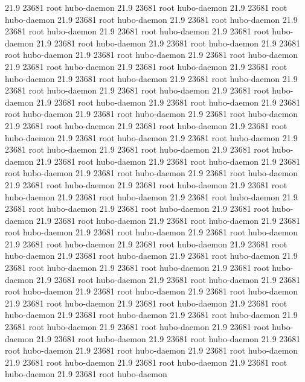 21.9 23681 root     hubo-daemon
21.9 23681 root     hubo-daemon
21.9 23681 root     hubo-daemon
21.9 23681 root     hubo-daemon
21.9 23681 root     hubo-daemon
21.9 23681 root     hubo-daemon
21.9 23681 root     hubo-daemon
21.9 23681 root     hubo-daemon
21.9 23681 root     hubo-daemon
21.9 23681 root     hubo-daemon
21.9 23681 root     hubo-daemon
21.9 23681 root     hubo-daemon
21.9 23681 root     hubo-daemon
21.9 23681 root     hubo-daemon
21.9 23681 root     hubo-daemon
21.9 23681 root     hubo-daemon
21.9 23681 root     hubo-daemon
21.9 23681 root     hubo-daemon
21.9 23681 root     hubo-daemon
21.9 23681 root     hubo-daemon
21.9 23681 root     hubo-daemon
21.9 23681 root     hubo-daemon
21.9 23681 root     hubo-daemon
21.9 23681 root     hubo-daemon
21.9 23681 root     hubo-daemon
21.9 23681 root     hubo-daemon
21.9 23681 root     hubo-daemon
21.9 23681 root     hubo-daemon
21.9 23681 root     hubo-daemon
21.9 23681 root     hubo-daemon
21.9 23681 root     hubo-daemon
21.9 23681 root     hubo-daemon
21.9 23681 root     hubo-daemon
21.9 23681 root     hubo-daemon
21.9 23681 root     hubo-daemon
21.9 23681 root     hubo-daemon
21.9 23681 root     hubo-daemon
21.9 23681 root     hubo-daemon
21.9 23681 root     hubo-daemon
21.9 23681 root     hubo-daemon
21.9 23681 root     hubo-daemon
21.9 23681 root     hubo-daemon
21.9 23681 root     hubo-daemon
21.9 23681 root     hubo-daemon
21.9 23681 root     hubo-daemon
21.9 23681 root     hubo-daemon
21.9 23681 root     hubo-daemon
21.9 23681 root     hubo-daemon
21.9 23681 root     hubo-daemon
21.9 23681 root     hubo-daemon
21.9 23681 root     hubo-daemon
21.9 23681 root     hubo-daemon
21.9 23681 root     hubo-daemon
21.9 23681 root     hubo-daemon
21.9 23681 root     hubo-daemon
21.9 23681 root     hubo-daemon
21.9 23681 root     hubo-daemon
21.9 23681 root     hubo-daemon
21.9 23681 root     hubo-daemon
21.9 23681 root     hubo-daemon
21.9 23681 root     hubo-daemon
21.9 23681 root     hubo-daemon
21.9 23681 root     hubo-daemon
21.9 23681 root     hubo-daemon
21.9 23681 root     hubo-daemon
21.9 23681 root     hubo-daemon
21.9 23681 root     hubo-daemon
21.9 23681 root     hubo-daemon
21.9 23681 root     hubo-daemon
21.9 23681 root     hubo-daemon
21.9 23681 root     hubo-daemon
21.9 23681 root     hubo-daemon
21.9 23681 root     hubo-daemon
21.9 23681 root     hubo-daemon
21.9 23681 root     hubo-daemon
21.9 23681 root     hubo-daemon
21.9 23681 root     hubo-daemon
21.9 23681 root     hubo-daemon
21.9 23681 root     hubo-daemon
21.9 23681 root     hubo-daemon
21.9 23681 root     hubo-daemon
21.9 23681 root     hubo-daemon
